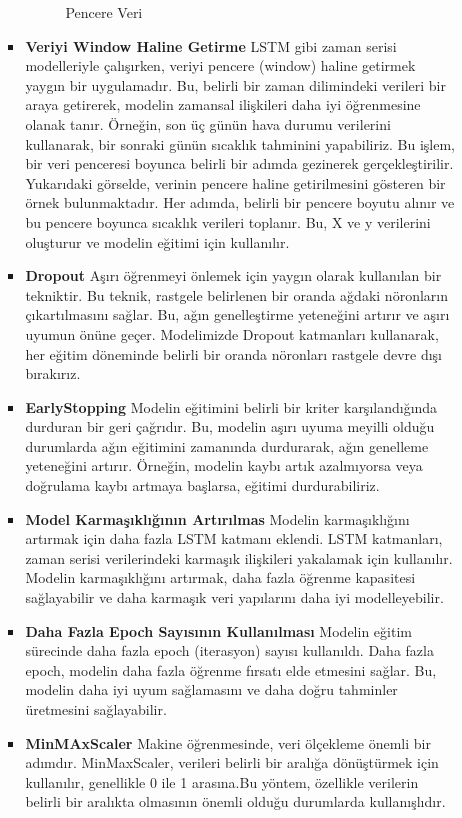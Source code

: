 \documentclass[12pt,a4paper]{article}
\begin{document}
\begin{enumerate}
\begin{itemize}
\begin{itemize}
\begin{figure}[h]
    \caption{Pencere Veri}
    
\end{figure}
\item {\bf\fontsize{12pt}{14pt}\selectfont Veriyi Window Haline Getirme}   LSTM gibi zaman serisi modelleriyle çalışırken, veriyi pencere (window) haline getirmek yaygın bir uygulamadır. Bu, belirli bir zaman dilimindeki verileri bir araya getirerek, modelin zamansal ilişkileri daha iyi öğrenmesine olanak tanır. Örneğin, son üç günün hava durumu verilerini kullanarak, bir sonraki günün sıcaklık tahminini yapabiliriz. Bu işlem, bir veri penceresi boyunca belirli bir adımda gezinerek gerçekleştirilir.
Yukarıdaki görselde, verinin pencere haline getirilmesini gösteren bir örnek bulunmaktadır. Her adımda, belirli bir pencere boyutu alınır ve bu pencere boyunca sıcaklık verileri toplanır. Bu, X ve y verilerini oluşturur ve modelin eğitimi için kullanılır.
\item {\bf\fontsize{12pt}{14pt}\selectfont Dropout}  Aşırı öğrenmeyi önlemek için yaygın olarak kullanılan bir tekniktir. Bu teknik, rastgele belirlenen bir oranda ağdaki nöronların çıkartılmasını sağlar. Bu, ağın genelleştirme yeteneğini artırır ve aşırı uyumun önüne geçer. Modelimizde Dropout katmanları kullanarak, her eğitim döneminde belirli bir oranda nöronları rastgele devre dışı bırakırız.
\item {\bf\fontsize{12pt}{14pt}\selectfont EarlyStopping}  Modelin eğitimini belirli bir kriter karşılandığında durduran bir geri çağrıdır. Bu, modelin aşırı uyuma meyilli olduğu durumlarda ağın eğitimini zamanında durdurarak, ağın genelleme yeteneğini artırır. Örneğin, modelin kaybı artık azalmıyorsa veya doğrulama kaybı artmaya başlarsa, eğitimi durdurabiliriz.
\item {\bf\fontsize{12pt}{14pt}\selectfont Model Karmaşıklığının Artırılmas} Modelin karmaşıklığını artırmak için daha fazla LSTM katmanı eklendi. LSTM katmanları, zaman serisi verilerindeki karmaşık ilişkileri yakalamak için kullanılır. Modelin karmaşıklığını artırmak, daha fazla öğrenme kapasitesi sağlayabilir ve daha karmaşık veri yapılarını daha iyi modelleyebilir.
\item {\bf\fontsize{12pt}{14pt}\selectfont Daha Fazla Epoch Sayısının Kullanılması} Modelin eğitim sürecinde daha fazla epoch (iterasyon) sayısı kullanıldı. Daha fazla epoch, modelin daha fazla öğrenme fırsatı elde etmesini sağlar. Bu, modelin daha iyi uyum sağlamasını ve daha doğru tahminler üretmesini sağlayabilir.
\newpage
\item {\bf\fontsize{12pt}{14pt}\selectfont MinMAxScaler }\newline\newline
Makine öğrenmesinde, veri ölçekleme önemli bir adımdır.
MinMaxScaler, verileri belirli bir aralığa dönüştürmek için kullanılır, genellikle 0 ile 1 arasına.Bu yöntem, özellikle verilerin belirli bir aralıkta olmasının önemli olduğu durumlarda kullanışlıdır\cite{minmax}.


\end{itemize}
\end{itemize}
\end{enumerate}
\end{document}
